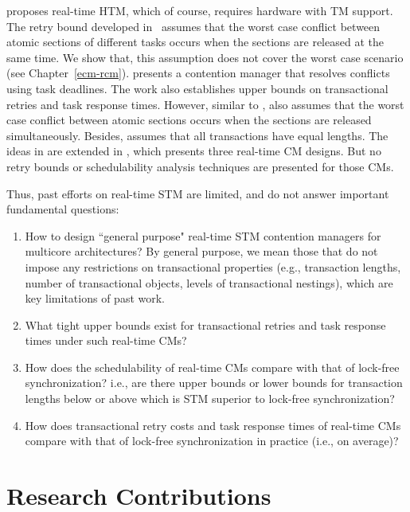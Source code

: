 \documentclass[12pt,english]{report}
\begin{document}
\cite{schoeberl2010rttm} proposes real-time HTM, which of course, requires hardware with TM support. The retry bound developed in~\cite{schoeberl2010rttm} assumes that the worst case conflict between atomic sections of different tasks occurs when the sections are released at the same time. We show that, this assumption does not cover the worst case scenario (see Chapter~\ref{ecm-rcm}). \cite{6045438} presents a contention manager that resolves conflicts using task deadlines. The work also establishes upper bounds on transactional retries and task response times. However, similar to \cite{schoeberl2010rttm}, \cite{6045438} also assumes that the worst case conflict between atomic sections occurs when the sections are released simultaneously. Besides, \cite{6045438} assumes that all transactions have equal lengths. The ideas in \cite{6045438} are extended in \cite{barrosmanaging}, which presents three real-time CM designs. But no retry bounds or schedulability analysis techniques are presented for those CMs.

Thus, past efforts on real-time STM are limited, and do not answer important fundamental questions:
\begin{enumerate}[(1)]
\item How to design ``general purpose" real-time STM contention managers for multicore architectures? By general purpose, we mean those that do not impose any restrictions on transactional properties (e.g., transaction lengths, number of transactional objects, levels of transactional nestings), which are key limitations of past work. 
\item What tight upper bounds exist for transactional retries and task response times under such real-time CMs?
\item How does the schedulability of real-time CMs compare with that of lock-free synchronization? i.e., are there upper bounds or lower bounds for transaction lengths below or above which is STM superior to lock-free synchronization?
\item How does transactional retry costs and task response times of real-time CMs compare with that of lock-free synchronization in practice (i.e., on average)?
\end{enumerate}

\section{Research Contributions}
\end{document}
